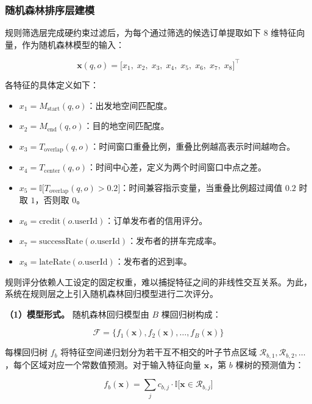 \subsubsection{随机森林排序层建模}

规则筛选层完成硬约束过滤后，为每个通过筛选的候选订单提取如下 8 维特征向量，作为随机森林模型的输入：

\begin{equation}
\mathbf{x}(q, o) = \bigl[
x_1,\; x_2,\; x_3,\; x_4,\; x_5,\; x_6,\; x_7,\; x_8
\bigr]^{\top}
\label{eq:feature-vector}
\end{equation}

各特征的具体定义如下：

\begin{itemize}
  \item $x_1 = M_{\text{start}}(q, o)$：出发地空间匹配度。
  \item $x_2 = M_{\text{end}}(q, o)$：目的地空间匹配度。
  \item $x_3 = T_{\text{overlap}}(q, o)$：时间窗口重叠比例，重叠比例越高表示时间越吻合。
  \item $x_4 = T_{\text{center}}(q, o)$：时间中心差，定义为两个时间窗口中点之差。
  \item $x_5 = \mathbb{I}\bigl[T_{\text{overlap}}(q, o) > 0.2\bigr]$：时间兼容指示变量，当重叠比例超过阈值 $0.2$ 时取 $1$，否则取 $0$。
  \item $x_6 = \text{credit}(o.\text{userId})$：订单发布者的信用评分。
  \item $x_7 = \text{successRate}(o.\text{userId})$：发布者的拼车完成率。
  \item $x_8 = \text{lateRate}(o.\text{userId})$：发布者的迟到率。
\end{itemize}

规则评分依赖人工设定的固定权重，难以捕捉特征之间的非线性交互关系。为此，系统在规则层之上引入随机森林回归模型进行二次评分。

\textbf{（1）模型形式。}
随机森林回归模型由 $B$ 棵回归树构成：

\begin{equation}
\mathcal{F} = \{ f_1(\mathbf{x}), f_2(\mathbf{x}), \dots, f_B(\mathbf{x}) \}
\label{eq:rf-ensemble}
\end{equation}

每棵回归树 $f_b$ 将特征空间递归划分为若干互不相交的叶子节点区域 $\mathcal{R}_{b,1}, \mathcal{R}_{b,2}, \dots$，每个区域对应一个常数值预测。对于输入特征向量 $\mathbf{x}$，第 $b$ 棵树的预测值为：

\begin{equation}
f_b(\mathbf{x}) = \sum_{j} c_{b,j} \cdot \mathbb{I}\bigl[\mathbf{x} \in \mathcal{R}_{b,j}\bigr]
\label{eq:tree-pred}
\end{equation}

